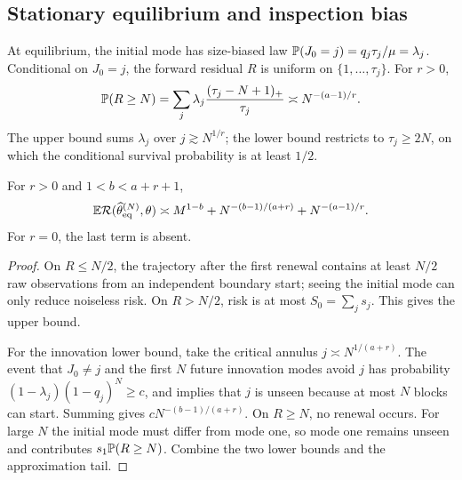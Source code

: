 \subsection{Stationary equilibrium and inspection bias}
At equilibrium, the initial mode has size-biased law
$\mathbb{P}(J_0=j)=q_j\tau_j/\mu=\lambda_j$. Conditional on $J_0=j$, the forward
residual $R$ is uniform on $\{1,\ldots,\tau_j\}$. For $r>0$,
\[
\mathbb{P}(R\ge N)=\sum_j\lambda_j
\frac{(\tau_j-N+1)_+}{\tau_j}
\mathrel{\asymp} N^{-(a-1)/r}.
\]
The upper bound sums $\lambda_j$ over $j\gtrsim N^{1/r}$; the lower bound
restricts to $\tau_j\ge2N$, on which the conditional survival probability is
at least $1/2$.

\begin{theorem}
For $r>0$ and $1<b<a+r+1$,
\[
\mathbb{E}\mathcal{R}(\widehat\theta^{(N)}_{\rm eq},\theta)
\mathrel{\asymp} M^{1-b}+N^{-(b-1)/(a+r)}+N^{-(a-1)/r}.
\]
For $r=0$, the last term is absent.
\end{theorem}

\begin{proof}
On $R\le N/2$, the trajectory after the first renewal contains at least $N/2$
raw observations from an independent boundary start; seeing the initial mode
can only reduce noiseless risk. On $R>N/2$, risk is at most
$S_0=\sum_js_j$. This gives the upper bound.

For the innovation lower bound, take the critical annulus
$j\asymp N^{1/(a+r)}$. The event that $J_0\ne j$ and the first $N$ future
innovation modes avoid $j$ has probability
$(1-\lambda_j)(1-q_j)^N\ge c$, and implies that $j$ is unseen because at most
$N$ blocks can start. Summing gives $cN^{-(b-1)/(a+r)}$. On $R\ge N$, no
renewal occurs. For large $N$ the initial mode must differ from mode one, so
mode one remains unseen and contributes $s_1\mathbb{P}(R\ge N)$. Combine the two
lower bounds and the approximation tail.
\end{proof}

